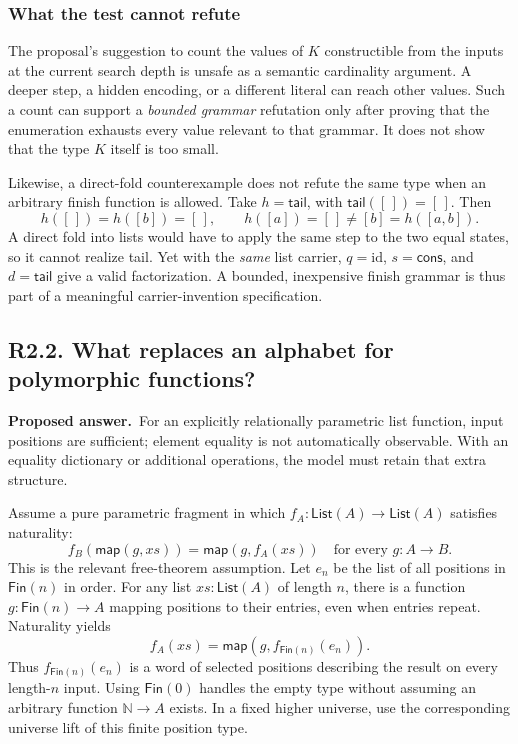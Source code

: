 \documentclass[11pt,a4paper]{article}
\newcommand{\Nat}{\mathbb{N}}
\newcommand{\List}{\mathsf{List}}
\newcommand{\Fin}{\mathsf{Fin}}
\newcommand{\nil}{[\,]}
\newcommand{\question}[2]{\subsection{#1. #2}\label{q:#1}}
\newcommand{\answer}{\textbf{Proposed answer.}\ }
\theoremstyle{remark}
\begin{document}
\subsubsection*{What the test cannot refute}

The proposal's suggestion to count the values of $K$ constructible from the
inputs at the current search depth is unsafe as a semantic cardinality
argument. A deeper step, a hidden encoding, or a different literal can reach
other values. Such a count can support a \emph{bounded grammar} refutation
only after proving that the enumeration exhausts every value relevant to
that grammar. It does not show that the type $K$ itself is too small.

Likewise, a direct-fold counterexample does not refute the same type when an
arbitrary finish function is allowed. Take $h=\mathsf{tail}$, with
$\mathsf{tail}(\nil)=\nil$. Then
\[
 h(\nil)=h([b])=\nil,\qquad h([a])=\nil\ne[b]=h([a,b]).
\]
A direct fold into lists would have to apply the same step to the two equal
states, so it cannot realize tail. Yet with the \emph{same} list carrier,
$q=\mathrm{id}$, $s=\mathsf{cons}$, and $d=\mathsf{tail}$ give a valid
factorization. A bounded, inexpensive finish grammar is thus part of a
meaningful carrier-invention specification.

\question{R2.2}{What replaces an alphabet for polymorphic functions?}

\answer For an explicitly relationally parametric list function, input
positions are sufficient; element equality is not automatically observable.
With an equality dictionary or additional operations, the model must retain
that extra structure.

Assume a pure parametric fragment in which
$f_A:\List(A)\to\List(A)$ satisfies naturality:
\begin{equation}\label{eq:naturality}
 f_B(\mathsf{map}(g,xs))=\mathsf{map}(g,f_A(xs))
 \quad\text{for every }g:A\to B.
\end{equation}
This is the relevant free-theorem assumption.\cite{wadler}
Let $e_n$ be the list of all positions in $\Fin(n)$ in order. For any list
$xs:\List(A)$ of length $n$, there is a function $g:\Fin(n)\to A$ mapping
positions to their entries, even when entries repeat. Naturality yields
\[
 f_A(xs)=\mathsf{map}(g,f_{\Fin(n)}(e_n)).
\]
Thus $f_{\Fin(n)}(e_n)$ is a word of selected positions describing the result
on every length-$n$ input. Using $\Fin(0)$ handles the empty type without
assuming an arbitrary function $\Nat\to A$ exists. In a fixed higher
universe, use the corresponding universe lift of this finite position type.
\end{document}
